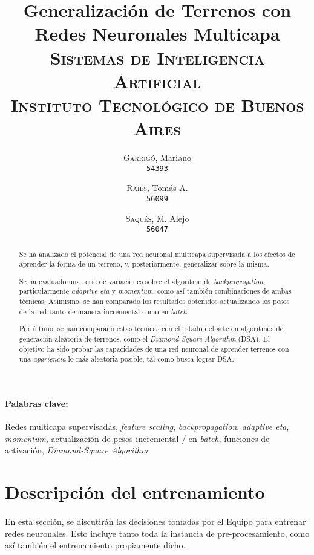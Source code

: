 \documentclass[12pt, twocolumn]{article}
\begin{document}
	\title{Generalización de Terrenos con Redes Neuronales Multicapa \\ 
		   \large{\textsc{Sistemas de Inteligencia Artificial}} \\
		   \normalsize{\textsc{Instituto Tecnológico de Buenos Aires}}}
	\author{
		\textsc{Garrigó}, Mariano \\
		\texttt{54393}
		\and
		\textsc{Raies}, Tomás A. \\
		\texttt{56099}
		\and
		\textsc{Saqués}, M. Alejo \\
		\texttt{56047} 
	}
	\date{}
	\maketitle
	
	\begin{abstract}
		Se ha analizado el potencial de una red neuronal multicapa supervisada a los efectos de aprender la forma de un terreno, y, posteriormente, generalizar sobre la misma.
		
		Se ha evaluado una serie de variaciones sobre el algoritmo de \textit{backpropagation}, particularmente \textit{adaptive eta} y \textit{momentum}, como así también combinaciones de ambas técnicas. Asimismo, se han comparado los resultados obtenidos actualizando los pesos de la red tanto de manera incremental como en \textit{batch}. 
		
		Por último, se han comparado estas técnicas con el estado del arte en algoritmos de generación aleatoria de terrenos, como el \textit{Diamond-Square Algorithm} (DSA). El objetivo ha sido probar las capacidades de una red neuronal de aprender terrenos con una \textit{apariencia} lo más aleatoria posible, tal como busca lograr DSA. 
	\end{abstract}
	
	\paragraph{Palabras clave:} Redes multicapa supervisadas, \textit{feature scaling}, \textit{backpropagation}, \textit{adaptive eta}, \textit{momentum}, actualización de pesos incremental / en \textit{batch}, funciones de activación, \textit{Diamond-Square Algorithm}.
	
	\section{Descripción del entrenamiento}
	
	\paragraph{} En esta sección, se discutirán las decisiones tomadas por el Equipo para entrenar redes neuronales. Esto incluye tanto toda la instancia de pre-procesamiento, como así también el entrenamiento propiamente dicho. 
	
\end{document}

